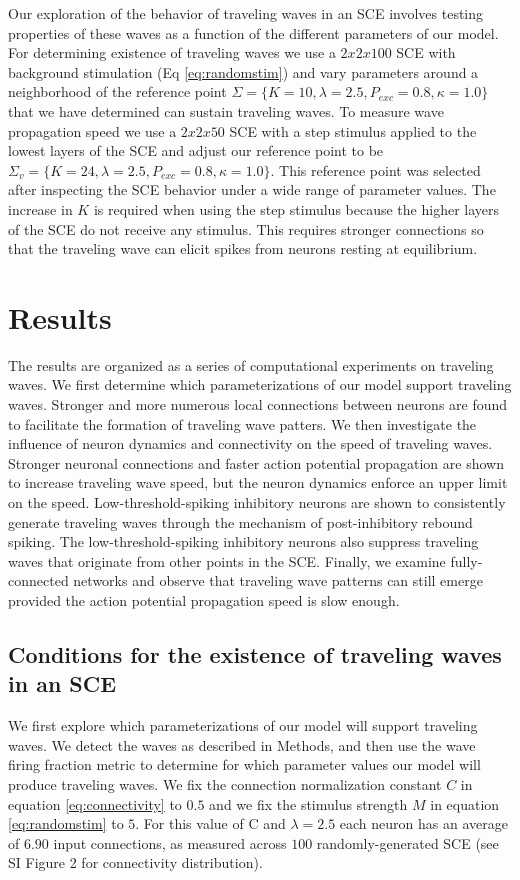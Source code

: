 \documentclass[12pt]{article}
\begin{document}
Our exploration of the behavior of traveling waves in an SCE involves testing properties of these waves as a function of the different parameters of our model.
For determining existence of traveling waves we use a $2x2x100$ SCE  with background stimulation (Eq \ref{eq:randomstim}) and vary parameters around a neighborhood of the reference point $\Sigma = \{K=10,\lambda=2.5,P_{exc}=0.8,\kappa=1.0 \}$ that we have determined can sustain traveling waves.
To measure wave propagation speed we use a $2x2x50$ SCE with  a step stimulus applied to the lowest layers of the SCE and adjust our reference point to be $\Sigma_v = \{K=24,\lambda=2.5,P_{exc}=0.8,\kappa=1.0 \}$.
This reference point was selected after inspecting the SCE behavior under a wide range of parameter values.
The increase in $K$ is required when using the step stimulus because the higher layers of the SCE do not receive any stimulus.
This requires stronger connections so that the traveling wave can elicit spikes from neurons resting at equilibrium.
\FloatBarrier

\section{Results}
The results are organized as a series of computational experiments on traveling waves.
We first determine which parameterizations of our model support traveling waves.
Stronger and more numerous local connections between neurons are found to facilitate the formation of traveling wave patters.
We then investigate the influence of neuron dynamics and connectivity on the speed of traveling waves.
Stronger neuronal connections and faster action potential propagation are shown to increase traveling wave speed, but the neuron dynamics enforce an upper limit on the speed. 
Low-threshold-spiking inhibitory neurons are shown to consistently generate traveling waves through the mechanism of post-inhibitory rebound spiking.
The low-threshold-spiking inhibitory neurons also suppress traveling waves that originate from other points in the SCE.
Finally, we examine fully-connected networks and observe that traveling wave patterns can still emerge provided the action potential propagation speed is slow enough.

\subsection{Conditions for the existence of traveling waves in an SCE} \label{sub:waves}
We first explore which parameterizations of our model will support traveling waves.
We detect the waves as described in Methods, and then use the wave firing fraction metric to determine for which parameter values our model will produce traveling waves.
We fix the connection normalization constant $C$ in equation \ref{eq:connectivity} to $0.5$ and we fix the stimulus strength $M$ in equation \ref{eq:randomstim} to $5$.
For this value of C and $\lambda=2.5$ each neuron has an average of $6.90$ input connections, as measured across $100$ randomly-generated SCE (see SI Figure 2 for connectivity distribution).
\end{document}
